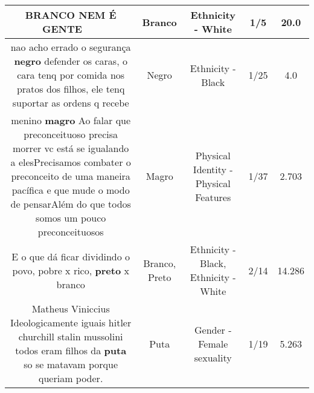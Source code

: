 \documentclass[11pt]{article}
\newlength\mylength
\begin{document}
\begin{center}
\begin{longtable}{|C{.65\mylength}|C{.30\mylength}|C{.12\mylength}|C{.12\mylength}|C{.12\mylength}|}
  \small BRANCO NEM É GENTE 👻🖕💨🐖🐁\normalsize   & Branco & Ethnicity - White & 1/5 & 20.0 \\  \hline
  \small nao acho errado o segurança \textbf{negro} defender os caras, o cara tenq por comida nos pratos dos filhos, ele tenq suportar as ordens q recebe\normalsize   & Negro & Ethnicity - Black & 1/25 & 4.0 \\  \hline
  \small menino \textbf{magro} Ao falar que preconceituoso precisa morrer vc está se igualando a elesPrecisamos combater o preconceito de uma maneira pacífica e que mude o modo de pensarAlém do que todos somos um pouco preconceituosos\normalsize   & Magro & Physical Identity - Physical Features & 1/37 & 2.703 \\  \hline
  \small E o que dá ficar dividindo o povo, pobre x rico, \textbf{preto} x branco\normalsize   & Branco, Preto & Ethnicity - Black, Ethnicity - White & 2/14 & 14.286 \\  \hline
  \small Matheus Viniccius Ideologicamente iguais hitler churchill stalin mussolini todos eram filhos da \textbf{puta} so se matavam porque queriam poder.\normalsize   & Puta & Gender - Female sexuality & 1/19 & 5.263 \\  \hline

\end{longtable}
\end{center}
\end{document}
